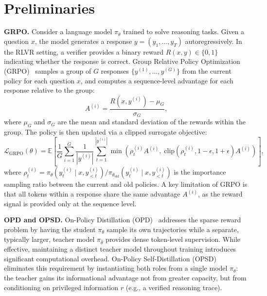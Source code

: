 \documentclass[]{jingdong}
\begin{document}


\section{Preliminaries}
\label{sec:prelim}
 
\noindent \textbf{GRPO.}
Consider a language model $\pi_\theta$ trained to solve reasoning tasks.
Given a question $x$, the model generates a response $y = (y_1, \dots, y_T)$ autoregressively.
In the RLVR setting, a verifier provides a binary reward $R(x, y) \in \{0, 1\}$ indicating whether the response is correct.
Group Relative Policy Optimization (GRPO)~\citep{grpo} samples a group of $G$ responses $\{y^{(1)}, \dots, y^{(G)}\}$ from the current policy for each question $x$, and computes a sequence-level advantage for each response relative to the group:
\begin{equation}
    A^{(i)} = \frac{R(x, y^{(i)}) - \mu_G}{\sigma_G},
\end{equation}
where $\mu_G$ and $\sigma_G$ are the mean and standard deviation of the rewards within the group.
The policy is then updated via a clipped surrogate objective:
\begin{equation}
    \mathcal{L}_{\text{GRPO}}(\theta) = \mathbb{E}\left[\frac{1}{G}\sum_{i=1}^{G}\frac{1}{|y^{(i)}|}\sum_{t=1}^{|y^{(i)}|} \min\!\left(\rho_t^{(i)} A^{(i)},\; \text{clip}\!\left(\rho_t^{(i)}, 1-\epsilon, 1+\epsilon\right) A^{(i)}\right)\right],
    \label{eq:grpo}
\end{equation}
where $\rho_t^{(i)} = \pi_\theta(y_t^{(i)} \mid x, y_{<t}^{(i)}) / \pi_{\theta_{\text{old}}}(y_t^{(i)} \mid x, y_{<t}^{(i)})$ is the importance sampling ratio between the current and old policies.
A key limitation of GRPO is that all tokens within a response share the same advantage $A^{(i)}$, as the reward signal is provided only at the sequence level.
 

\noindent \textbf{OPD and OPSD.}
On-Policy Distillation (OPD)~\citep{agarwal2024gkd} addresses the sparse reward problem by having the student $\pi_\theta$ sample its own trajectories while a separate, typically larger, teacher model $\pi_{\hat{\theta}}$ provides dense token-level supervision.
While effective, maintaining a distinct teacher model throughout training introduces significant computational overhead.
On-Policy Self-Distillation (OPSD)~\citep{zhao2026opsd,hbotter2026reinforcementlearningselfdistillation_sdpo} eliminates this requirement by instantiating both roles from a single model $\pi_\theta$: the teacher gains its informational advantage not from greater capacity, but from conditioning on privileged information $r$ (e.g., a verified reasoning trace).
\end{document}
